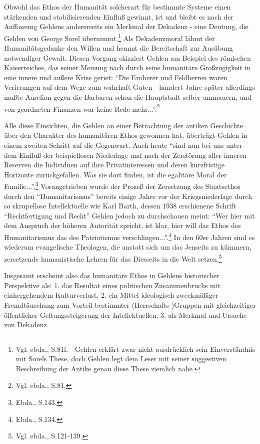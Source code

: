 \documentclass[12pt,a4paper]{article}
\begin{document}
Obwohl das Ethos der Humanität solcherart für bestimmte Systeme einen
stärkenden und stabilisierenden Einfluß gewinnt, ist und bleibt es nach der
Auffassung Gehlens andererseits ein Merkmal der Dekadenz - eine Deutung, die
Gehlen von George Sorel übernimmt.\footnote{Vgl. ebda., S.81f. - Gehlen
erklärt zwar nicht ausdrücklich sein Einverständnis mit Sorels These, doch
Gehlen legt dem Leser mit seiner suggestiven Beschreibung der Antike genau
diese These ziemlich nahe.} Als Dekadenzmoral lähmt der Humanitätsgedanke den
Willen und hemmt die Bereitschaft zur Ausübung notwendiger Gewalt. Diesen
Vorgang skizziert Gehlen am Beispiel des römischen Kaiserreiches, das seiner
Meinung nach durch seine humanitäre Großzügigkeit in eine innere und äußere
Krise geriet: "`Die Eroberer und Feldherren waren Verirrungen auf dem Wege
zum wahrhaft Guten - hundert Jahre später allerdings mußte Aurelian gegen die
Barbaren schon die Hauptstadt selber ummauern, und von geordneten Finanzen
war keine Rede mehr..."'.\footnote{Vgl. ebda., S.81.}

Alle diese Einsichten, die Gehlen an einer Betrachtung der antiken Geschichte
über den Charakter des humanitären Ethos gewonnen hat, überträgt Gehlen in
einem zweiten Schritt auf die Gegenwart. Auch heute "`sind nun bei uns unter
dem Einfluß der beispiellosen Niederlage und nach der Zerstörung aller inneren
Reserven die Individuen auf ihre Privatinteressen und deren kurzfristige
Horizonte zurückgefallen. Was sie dort finden, ist die egalitäre Moral der
Familie..."'.\footnote{Ebda., S.143.} Vorangetrieben wurde der Prozeß der
Zersetzung des Staatsethos durch den "`Humanitarismus"' bereits einige Jahre
vor der Kriegsniederlage durch so skrupellose Intellektuelle wie Karl Barth,
dessen 1938 erschienene Schrift "`Rechtfertigung und Recht"' Gehlen jedoch zu
durchschauen meint: "`Wer hier mit dem Anspruch der höheren Autorität spricht,
ist klar, hier will das Ethos des Humanitarismus das des Patriotismus
verschlingen..."'.\footnote{Ebda., S.134.} In den 60er Jahren sind es wiederum
evangelische Theologen, die anstatt sich um das Jenseits zu kümmern,
zersetzende humanistische Lehren für das Diesseits in die Welt
setzen.\footnote{Vgl. ebda., S.121-139.}

Insgesamt erscheint also das humanitäre Ethos in Gehlens historischer
Perspektive als: 1. das Resultat eines politischen Zusammenbruchs mit
einhergehendem Kulturverlust, 2. ein Mittel ideologisch zweckmäßiger
Fremdtäuschung zum Vorteil bestimmter (Herrschafts-)Gruppen mit
gleichzeitiger öffentlicher Geltungssteigerung der Intellektuellen, 3. als
Merkmal und Ursache von Dekadenz.
\end{document}
